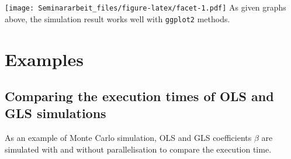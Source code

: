 \documentclass[11pt,a4paper]{article}
\begin{document}
\texttt{[image: Seminararbeit\_files/figure-latex/facet-1.pdf]} As given
graphs above, the simulation result works well with \texttt{ggplot2}
methods.

\hypertarget{examples}{%
\section{Examples}\label{examples}}

\hypertarget{comparing-the-execution-times-of-ols-and-gls-simulations}{%
\subsection{Comparing the execution times of OLS and GLS
simulations}\label{comparing-the-execution-times-of-ols-and-gls-simulations}}

As an example of Monte Carlo simulation, OLS and GLS coefficients
\(\beta\) are simulated with and without parallelisation to compare the
execution time.
\end{document}
